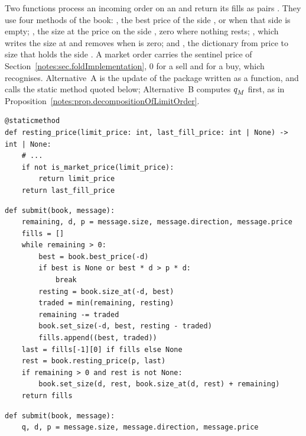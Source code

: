 \begin{question}
\label{question.precomputedMarketPartOnAWalkingSell}
Two functions process an incoming order on an 
and return its fills as pairs .
They use four methods of the book:
, the best price of the side ,
or  when that side is empty;
, the size at the price  on the side ,
zero where nothing rests;
, which writes the size  at 
and removes  when  is zero;
and , the dictionary from price to size that holds the side .
A market order carries the sentinel price of Section~\ref{notes:sec.foldImplementation},
0 for a sell and  for a buy,
which  recognises.
Alternative~A is the update of the package written as a function,
and calls the static method quoted below;
Alternative~B computes $q_{M}^{}$ first,
as in Proposition~\ref{notes:prop.decompositionOfLimitOrder}.
\begin{lstlisting}[caption={\protect\codehl{unito26.lob.orderbook.AggregateBook.resting\_price}, its docstring elided.}, label=listing.precomputedMarketPartRestingPrice]
@staticmethod
def resting_price(limit_price: int, last_fill_price: int | None) -> int | None:
    # ...
    if not is_market_price(limit_price):
        return limit_price
    return last_fill_price
\end{lstlisting}
\begin{lstlisting}[caption={Alternative A}, label=listing.precomputedMarketPartOnAWalkingSellA]
def submit(book, message):
    remaining, d, p = message.size, message.direction, message.price
    fills = []
    while remaining > 0:
        best = book.best_price(-d)
        if best is None or best * d > p * d:
            break
        resting = book.size_at(-d, best)
        traded = min(remaining, resting)
        remaining -= traded
        book.set_size(-d, best, resting - traded)
        fills.append((best, traded))
    last = fills[-1][0] if fills else None
    rest = book.resting_price(p, last)
    if remaining > 0 and rest is not None:
        book.set_size(d, rest, book.size_at(d, rest) + remaining)
    return fills
\end{lstlisting}
\begin{lstlisting}[caption={Alternative B}, label=listing.precomputedMarketPartOnAWalkingSellB]
def submit(book, message):
    q, d, p = message.size, message.direction, message.price

\end{lstlisting}
\end{question}
